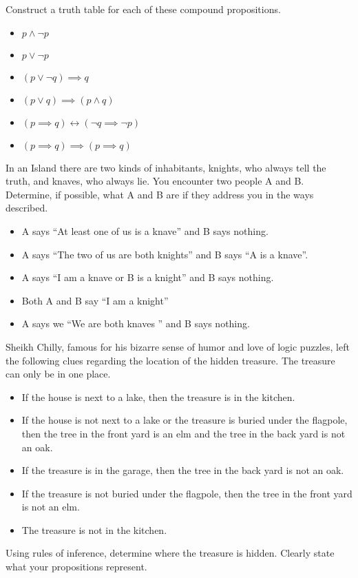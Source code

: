 \documentclass{article}
\newenvironment{problem}[2][Problem]{\begin{trivlist}
\item[\hskip \labelsep {\bfseries #1}\hskip \labelsep {\bfseries #2.}]}{\end{trivlist}}
\begin{document}
\begin{problem}{3}
Construct a truth table for each of these compound propositions.
\begin{itemize}
    \item[(a)] $ p \land \neg p$
    \item[(b)] $ p \lor \neg p$
    \item[(c)] $ (p \lor \neg q) \implies  q$
    \item[(d)] $ (p \lor q) \implies (p \land q) $
    \item[(e)] $ (p \implies q) \leftrightarrow (\neg q \implies \neg p) $
    \item[(f)] $ (p \implies q) \implies (p \implies q) $
\end{itemize}

\end{problem}

\begin{problem}{4}
In an Island there are two kinds of inhabitants, knights, who always tell the truth, and knaves, who always lie. You encounter two people
A and B. Determine, if possible, what A and B are if they address you in the ways described.
\begin{itemize}
    \item[(a)] A says ``At least one of us is a knave'' and B says nothing.
    \item[(b)] A says ``The two of us are both knights'' and B says ``A is a knave''. 
    \item[(c)] A says ``I am a knave or B is a knight'' and B says nothing.
    \item[(d)] Both A and B say ``I am a knight''
    \item[(e)] A says we ``We are both knaves '' and B says nothing. 
\end{itemize}
\end{problem}

\begin{problem}{5}
    Sheikh Chilly, famous for his bizarre sense of humor and love of logic puzzles, left the following clues
regarding the location of the hidden treasure. The treasure can only be in one place.
\begin{itemize}
    \item If the house is next to a lake, then the treasure is in the kitchen.
    \item If the house is not next to a lake or the treasure is buried under the flagpole, then the tree in the front yard is an elm and the tree in the back yard is not an oak.
    \item If the treasure is in the garage, then the tree in the back yard is not an oak.
    \item If the treasure is not buried under the flagpole, then the tree in the front yard is not an elm.
    \item The treasure is not in the kitchen.
\end{itemize}
Using rules of inference, determine where the treasure is hidden. Clearly state what your propositions
represent.
\end{problem}
\end{document}
